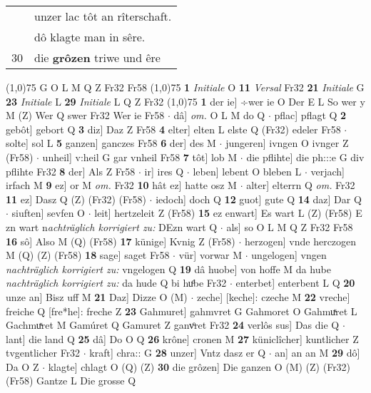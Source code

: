 \documentclass[8pt,a4paper,notitlepage]{article}
\begin{document}
\begin{table}[ht]
\begin{minipage}[t]{0.5\linewidth}
\begin{tabular}{rl}
 & unzer lac tôt an rîterschaft.\\ 
 & dô klagte man in sêre.\\ 
30 & die \textbf{grôzen} triwe und êre\\ 
\end{tabular}
\scriptsize
\line(1,0){75} \newline
G O L M Q Z Fr32 Fr58 \newline
\line(1,0){75} \newline
\textbf{1} \textit{Initiale} O  \textbf{11} \textit{Versal} Fr32  \textbf{21} \textit{Initiale} G  \textbf{23} \textit{Initiale} L  \textbf{29} \textit{Initiale} L Q Z Fr32  \newline
\line(1,0){75} \newline
\textbf{1} der ie] ÷wer ie O Der E L So wer y M (Z) Wer Q swer Fr32 Wer ie Fr58  $\cdot$ dâ] \textit{om.} O L M do Q  $\cdot$ pflac] pflagt Q \textbf{2} gebôt] gebort Q \textbf{3} diz] Daz Z Fr58 \textbf{4} elter] elten L elste Q (Fr32) edeler  Fr58  $\cdot$ solte] sol L \textbf{5} ganzen] ganczes Fr58 \textbf{6} der] des M  $\cdot$ jungeren] ivngen O ivnger Z (Fr58)  $\cdot$ unheil] v:heil G gar vnheil Fr58 \textbf{7} tôt] lob M  $\cdot$ die pflihte] die ph:::e G div pflihte Fr32 \textbf{8} der] Als Z Fr58  $\cdot$ ir] ires Q  $\cdot$ leben] lebent O bleben L  $\cdot$ verjach] irfach M \textbf{9} ez] or M \textit{om.} Fr32 \textbf{10} hât ez] hatte osz M  $\cdot$ alter] elterrn Q \textit{om.} Fr32 \textbf{11} ez] Dasz Q (Z) (Fr32) (Fr58)  $\cdot$ iedoch] doch Q \textbf{12} guot] gute Q \textbf{14} daz] Dar Q  $\cdot$ siuften] sevfen O  $\cdot$ leit] hertzeleit Z (Fr58) \textbf{15} ez enwart] Es wart L (Z) (Fr58) E zn wart n\textit{achträglich korrigiert zu: }DEzn wart Q  $\cdot$ als] so O L M Q Z Fr32 Fr58 \textbf{16} sô] Also M (Q) (Fr58) \textbf{17} künige] Kvnig Z (Fr58)  $\cdot$ herzogen] vnde herczogen M (Q) (Z) (Fr58) \textbf{18} sage] saget Fr58  $\cdot$ vür] vorwar M  $\cdot$ ungelogen] vngen \textit{nachträglich korrigiert zu:} vngelogen Q \textbf{19} dâ huobe] von hoffe M da hube \textit{nachträglich korrigiert zu:} da hude Q bi huͦbe Fr32  $\cdot$ enterbet] enterbent L Q \textbf{20} unze an] Bisz uff M \textbf{21} Daz] Dizze O (M)  $\cdot$ zeche] [keche]: czeche M \textbf{22} vreche] freiche Q [fre*he]: freche Z \textbf{23} Gahmuret] gahmvret G Gahmoret O Gahmuͯret L Gachmuͯret M Gamúret Q Gamuret Z ganvͦret Fr32 \textbf{24} verlôs sus] Das die Q  $\cdot$ lant] die land Q \textbf{25} dâ] Do O Q \textbf{26} krône] cronen M \textbf{27} küniclîcher] kuntlicher Z tvgentlicher Fr32  $\cdot$ kraft] chra:: G \textbf{28} unzer] Vntz dasz er Q  $\cdot$ an] an an M \textbf{29} dô] Da O Z  $\cdot$ klagte] chlagt O (Q) (Z) \textbf{30} die grôzen] Die ganzen O (M) (Z) (Fr32) (Fr58) Gantze L Die grosse Q \newline

\end{minipage}
\end{table}
\end{document}
